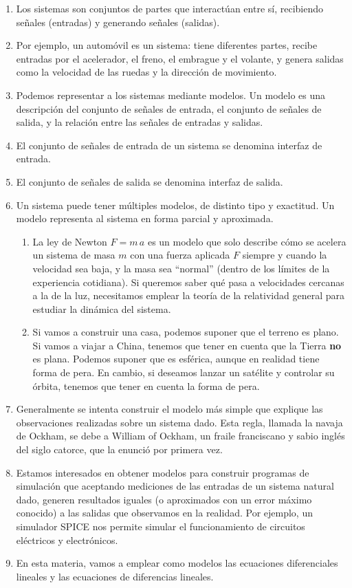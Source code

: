 \documentclass[11pt,a4paper,openany]{book}
\begin{document}
\begin{enumerate}
	
	\item Los sistemas son conjuntos de partes que interactúan entre sí, recibiendo señales (entradas) y generando señales (salidas).
	\item Por ejemplo, un automóvil es un sistema: tiene diferentes partes, recibe entradas por el acelerador, el freno, el embrague y el volante, y genera salidas como la velocidad de las ruedas y la dirección de movimiento.
	\item Podemos representar a los sistemas mediante modelos. Un modelo es una descripción del conjunto de señales de entrada, el conjunto de señales de salida, y la relación entre las señales de entradas y salidas.
	\item El conjunto de señales de entrada de un sistema se denomina interfaz de entrada.
	\item El conjunto de señales de salida se denomina interfaz de salida.
	\item Un sistema puede tener múltiples modelos, de distinto tipo y exactitud. Un modelo representa al sistema en forma parcial y aproximada.
	\begin{enumerate}
		\item La ley de Newton $F = m \, a$ es un modelo que solo describe cómo se acelera un sistema de masa $m$ con una fuerza aplicada $F$ siempre y cuando la velocidad sea baja, y la masa sea ``normal'' (dentro de los límites de la experiencia cotidiana). Si queremos saber qué pasa a velocidades cercanas a la de la luz, necesitamos emplear la teoría de la relatividad general para estudiar la dinámica del sistema.
		\item Si vamos a construir una casa, podemos suponer que el terreno es plano. Si vamos a viajar a China, tenemos que tener en cuenta que la Tierra \textbf{no} es plana. Podemos suponer que es esférica, aunque en realidad tiene forma de pera. En cambio, si deseamos lanzar un satélite y controlar su órbita, tenemos que tener en cuenta la forma de pera.
	\end{enumerate}
	\item Generalmente se intenta construir el modelo más simple que explique las observaciones realizadas sobre un sistema dado. Esta regla, llamada la navaja de Ockham, se debe a William of Ockham, un fraile franciscano y sabio inglés del siglo catorce, que la enunció por primera vez.
	\item Estamos interesados en obtener modelos para construir programas de simulación que aceptando mediciones de las entradas de un sistema natural dado, generen resultados iguales (o aproximados con un error máximo conocido) a las salidas que observamos en la realidad. Por ejemplo, un simulador SPICE nos permite simular el funcionamiento de circuitos eléctricos y electrónicos.
	\item En esta materia, vamos a emplear como modelos las ecuaciones diferenciales lineales y las ecuaciones de diferencias lineales.
\end{enumerate}
\end{document}
